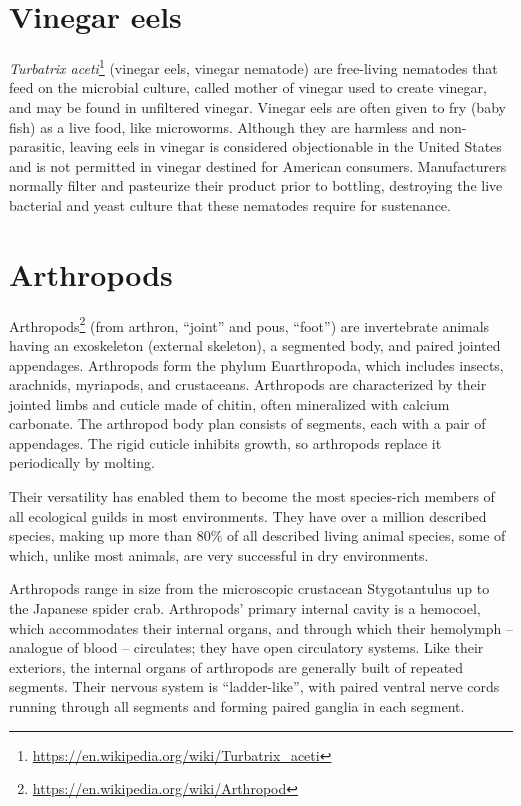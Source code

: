 \documentclass[]{book}
\let\rmarkdownfootnote\footnote%
\def\footnote{\protect\rmarkdownfootnote}
\renewcommand{\href}[2]{#2\footnote{\url{#1}}}
\begin{document}
\hypertarget{vinegar-eels}{%
\section{Vinegar eels}\label{vinegar-eels}}

\href{https://en.wikipedia.org/wiki/Turbatrix_aceti}{\emph{Turbatrix aceti}} (vinegar eels, vinegar nematode) are free-living nematodes that feed on the microbial culture, called mother of vinegar used to create vinegar, and may be found in unfiltered vinegar. Vinegar eels are often given to fry (baby fish) as a live food, like microworms. Although they are harmless and non-parasitic, leaving eels in vinegar is considered objectionable in the United States and is not permitted in vinegar destined for American consumers. Manufacturers normally filter and pasteurize their product prior to bottling, destroying the live bacterial and yeast culture that these nematodes require for sustenance.

\hypertarget{arthropods}{%
\section{Arthropods}\label{arthropods}}

\href{https://en.wikipedia.org/wiki/Arthropod}{Arthropods} (from arthron, ``joint'' and pous, ``foot'') are invertebrate animals having an exoskeleton (external skeleton), a segmented body, and paired jointed appendages. Arthropods form the phylum Euarthropoda, which includes insects, arachnids, myriapods, and crustaceans. Arthropods are characterized by their jointed limbs and cuticle made of chitin, often mineralized with calcium carbonate. The arthropod body plan consists of segments, each with a pair of appendages. The rigid cuticle inhibits growth, so arthropods replace it periodically by molting.

Their versatility has enabled them to become the most species-rich members of all ecological guilds in most environments. They have over a million described species, making up more than 80\% of all described living animal species, some of which, unlike most animals, are very successful in dry environments.

Arthropods range in size from the microscopic crustacean Stygotantulus up to the Japanese spider crab. Arthropods' primary internal cavity is a hemocoel, which accommodates their internal organs, and through which their hemolymph -- analogue of blood -- circulates; they have open circulatory systems. Like their exteriors, the internal organs of arthropods are generally built of repeated segments. Their nervous system is ``ladder-like'', with paired ventral nerve cords running through all segments and forming paired ganglia in each segment.
\end{document}
